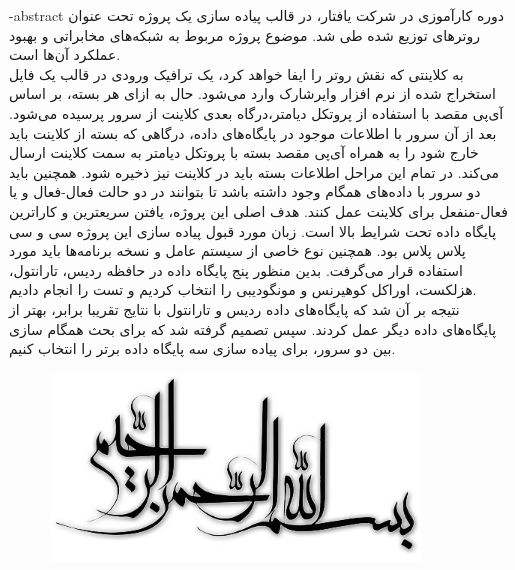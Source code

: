 \department{}

\fa-abstract{
دوره کارآموزی در شرکت یافتار، در قالب پیاده سازی یک پروژه تحت عنوان روترهای توزیع شده طی شد. موضوع پروژه مربوط به شبکه‌های مخابراتی و بهبود عملکرد آن‌ها است.
\\
به کلاینتی که نقش روتر را ایفا خواهد کرد، یک ترافیک ورودی در قالب یک فایل استخراج شده از نرم افزار وایرشارک وارد می‌شود. حال به ازای هر بسته، بر اساس آی‌پی مقصد با استفاده از پروتکل دیامتر،درگاه بعدی کلاینت از سرور پرسیده می‌شود. بعد از آن سرور با اطلاعات موجود در پایگاه‌های داده، درگاهی که بسته از کلاینت باید خارج شود را به همراه آی‌پی مقصد بسته با پروتکل دیامتر به سمت کلاینت ارسال می‌کند. در تمام این مراحل اطلاعات بسته باید در کلاینت نیز ذخیره شود. همچنین باید دو سرور با داده‌های همگام وجود داشته باشد تا بتوانند در دو حالت فعال-فعال و یا فعال-منفعل برای کلاینت عمل کنند. هدف اصلی این پروژه، یافتن سریعترین و کاراترین پایگاه داده تحت شرایط بالا است. زبان مورد قبول پیاده سازی این پروژه سی و سی پلاس پلاس بود. همچنین نوع خاصی از سیستم عامل و نسخه برنامه‌ها باید مورد استفاده قرار می‌گرفت. بدین منظور پنج پایگاه داده در حافظه ردیس، تارانتول، هزلکست، اوراکل کوهیرنس و مونگودیبی را انتخاب کردیم و تست را انجام دادیم.\\نتیجه بر آن شد که پایگاه‌های داده ردیس و تارانتول با نتایج تقریبا برابر، بهتر از پایگاه‌های داده دیگر عمل کردند. سپس تصمیم گرفته شد که برای بحث همگام سازی بین دو سرور، برای پیاده سازی سه پایگاه داده برتر را انتخاب کنیم.
}





\AUTtitle
\vspace*{7cm}
\thispagestyle{empty}
\begin{center}
\includegraphics[height=5cm,width=12cm]{besm}
\end{center}